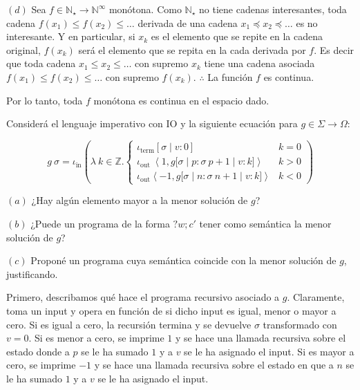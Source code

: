 \documentclass[a4paper, 12pt]{article}
\begin{document}
$(d)$ Sea $f \in \mathbb{N}_\star\to \mathbb{N}^\infty$ monótona. Como
$\mathbb{N}_\star$ no tiene cadenas interesantes, toda cadena $f(x_1) \leq
f(x_2) \leq \ldots$ derivada de una cadena $x_1 \preceq  x_2 \preceq \ldots$ es
no interesante. Y en particular, si $x_k$ es el elemento que se repite en la
cadena original, $f(x_k)$ será el elemento que se repita en la cada derivada por
$f$. Es decir que toda cadena $x_1 \leq x_2 \leq \ldots$ con supremo $x_k$ tiene
una cadena asociada $f(x_1) \leq f(x_2) \leq \ldots$ con supremo $f(x_k)$.
$\therefore $ La función $f$ es continua. 

Por lo tanto, toda $f$ monótona es continua en el espacio dado.


\pagebreak 

\begin{myframe}
  Considerá el lenguaje imperativo con IO y la siguiente ecuación para $g \in
  \Sigma \to \Omega$:

  \begin{equation*}
    g ~ \sigma = \iota_{\text{in}} \left( \lambda ~ k \in \mathbb{Z} . \begin{cases}
        \iota_{\text{term}}[\sigma \mid v : 0] &k = 0 \\ 
        \iota_{\text{out}}~\left<1, g \big[ \sigma \mid p : \sigma ~ p + 1 \mid
        v : k\big] \right> & k > 0\\ 
        \iota_{\text{out}} \left< -1, g \big[ \sigma \mid n : \sigma ~ n + 1
      \mid v : k  \big]  \right>& k < 0
    \end{cases} \right) 
  \end{equation*}

  $(a)$ ¿Hay algún elemento mayor a la menor solución de $g$? 

  $(b)$ ¿Puede un programa de la forma $?w;c'$ tener como semántica la menor
  solución de $g$? 

  $(c)$ Proponé un programa cuya semántica coincide con la menor solución de
  $g$, justificando.
\end{myframe}

Primero, describamos qué hace el programa recursivo asociado a $g$. Claramente,
toma un input y opera en función de si dicho input es igual, menor o mayor a
cero. Si es igual a cero, la recursión termina y se devuelve $\sigma$
transformado con $v = 0$. Si es menor a cero, se imprime $1$ y se hace una
llamada recursiva sobre el estado donde a $p$ se le ha sumado $1$ y a $v$ se le
ha asignado el input. Si es mayor a cero, se imprime $-1$ y se hace una llamada
recursiva sobre el estado en que a $n$ se le ha sumado $1$ y a $v$ se le ha
asignado el input.
\end{document}
